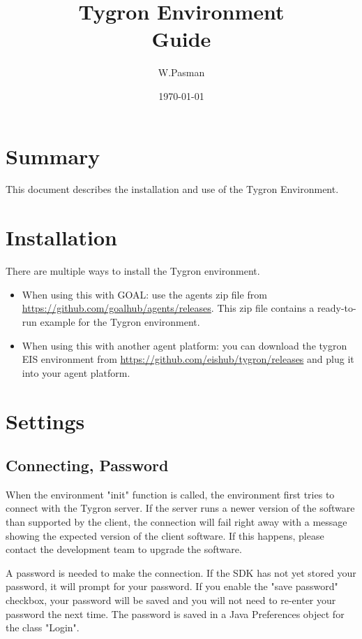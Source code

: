 \documentclass[english,11pt]{article}
\title{Tygron Environment \\ Guide}
\author{W.Pasman}
\date{\today}
\begin{document}
\maketitle

\newpage
\tableofcontents
\newpage

\section{Summary}

This document describes the installation and use of the Tygron Environment. 

\section{Installation}
There are multiple ways to install the Tygron environment. 
\begin{itemize}
\item When using this with GOAL: use the agents zip file from \url{https://github.com/goalhub/agents/releases}. This zip file contains a ready-to-run example for the Tygron environment. 
\item When using this with another agent platform: you can download the tygron EIS environment from 
\url{https://github.com/eishub/tygron/releases} and plug it into your agent platform. 
\end{itemize}

\section{Settings}
\subsection{Connecting, Password}
When the environment "init" function is called, the environment first tries to connect with the Tygron server.
If the server runs a newer version of the software than supported by the client, the connection will fail right away with a message showing the expected version of the client software. If this happens, please contact the development team to upgrade the software.

A password is needed to make the connection.
If the SDK has not yet stored your password, it will prompt for your password. If you enable the "save password" checkbox, your password will be saved and you will not need to re-enter your password the next time. The password is saved in a Java Preferences object for the class "Login".
\end{document}
